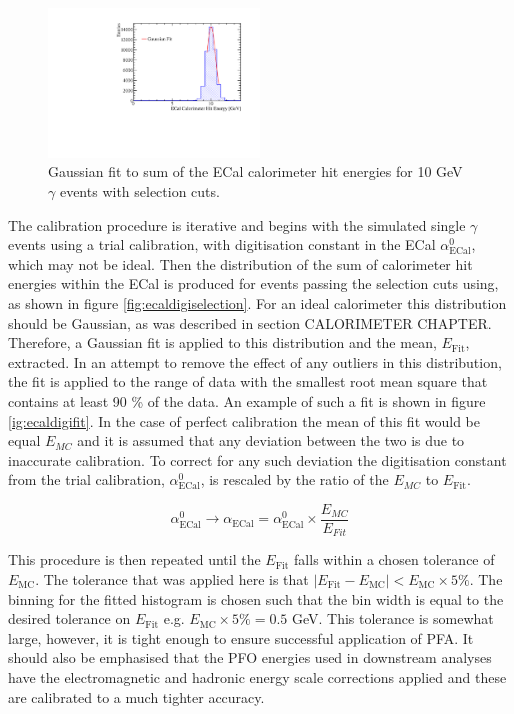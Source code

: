 \begin{figure}
\includegraphics[width=0.5\textwidth]{EnergyEstimators/Plots/Calibration/Digitsation/ECal/DigitisationECalFit.pdf}
\caption[Gaussian fit to sum of the ECal calorimeter hit energies for 10 GeV $\gamma$ events with selection cuts.]{Gaussian fit to sum of the ECal calorimeter hit energies for 10 GeV $\gamma$ events with selection cuts.}
\label{fig:ecaldigifit}
\end{figure}

The calibration procedure is iterative and begins with the simulated single $\gamma$ events using a trial calibration, with digitisation constant in the ECal $\alpha^{0}_{\text{ECal}}$, which may not be ideal.  Then the distribution of the sum of calorimeter hit energies within the ECal is produced for events passing the selection cuts using, as shown in figure \ref{fig:ecaldigiselection}.  For an ideal calorimeter this distribution should be Gaussian, as was described in section CALORIMETER CHAPTER.  Therefore, a Gaussian fit is applied to this distribution and the mean, $E_{\text{Fit}}$, extracted.  In an attempt to remove the effect of any outliers in this distribution, the fit is applied to the range of data with the smallest root mean square that contains at least 90 \% of the data.  An example of such a fit is shown in figure \ref{ig:ecaldigifit}.  In the case of perfect calibration the mean of this fit would be equal $E_{MC}$ and it is assumed that any deviation between the two is due to inaccurate calibration.  To correct for any such deviation the digitisation constant from the trial calibration, $\alpha^{0}_{\text{ECal}}$, is rescaled by the ratio of the $E_{MC}$ to $E_{\text{Fit}}$.

\begin{equation}
\alpha^{0}_{\text{ECal}} \rightarrow \alpha_{\text{ECal}} = \alpha^{0}_{\text{ECal}} \times \frac{E_{MC}}{E_{Fit}}
\end{equation}

This procedure is then repeated until the $E_{\text{Fit}}$ falls within a chosen tolerance of $E_{\text{MC}}$.  The tolerance that was applied here is that $|E_{\text{Fit}} - E_{\text{MC}}| < E_{\text{MC}} \times 5 \%$.  The binning for the fitted histogram is chosen such that the bin width is equal to the desired tolerance on $E_{\text{Fit}}$ e.g. $E_{\text{MC}} \times 5 \% = 0.5$ GeV.  This tolerance is somewhat large, however, it is tight enough to ensure successful application of PFA.  It should also be emphasised that the PFO energies used in downstream analyses have the electromagnetic and hadronic energy scale corrections applied and these are calibrated to a much tighter accuracy.

